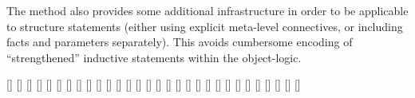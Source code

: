 \begin{isabellebody}
\begin{isamarkuptext}
  The \hyperlink{method.induct}{\mbox{}} method also provides some additional
  infrastructure in order to be applicable to structure statements
  (either using explicit meta-level connectives, or including facts
  and parameters separately).  This avoids cumbersome encoding of
  ``strengthened'' inductive statements within the object-logic.

  \begin{railoutput}
[]
\rail@bar
{}
[]
[]
[]
\rail@endbar
{}
\rail@bar
{}
\rail@plus
{}[]
[]
\rail@endplus
\rail@endbar
\rail@bar
{}
[]
\rail@endbar
\rail@end
{}
[]
\rail@bar
{}
[]
[]
[]
\rail@endbar
\rail@bar
{}
\rail@plus
{}[]
[]
\rail@endplus
\rail@endbar
{}
\rail@bar
{}
[]
\rail@endbar
\rail@bar
{}
[]
\rail@endbar
\rail@bar
{}
[]
\rail@endbar
\rail@end
{}
[]
[]
[]
\rail@bar
{}
[]
\rail@endbar
\rail@end
{}
\rail@bar
\rail@bar
{}[]
[]
[]
\rail@endbar
{}[]
\rail@plus
{}[]
\rail@endplus
{}
[]
[]
\rail@plus
{}[]
\rail@endplus
\rail@endbar
\rail@end
{}
\rail@bar
{}[]
\rail@bar
{}[]

\end{railoutput}
\end{isamarkuptext}
\end{isabellebody}
